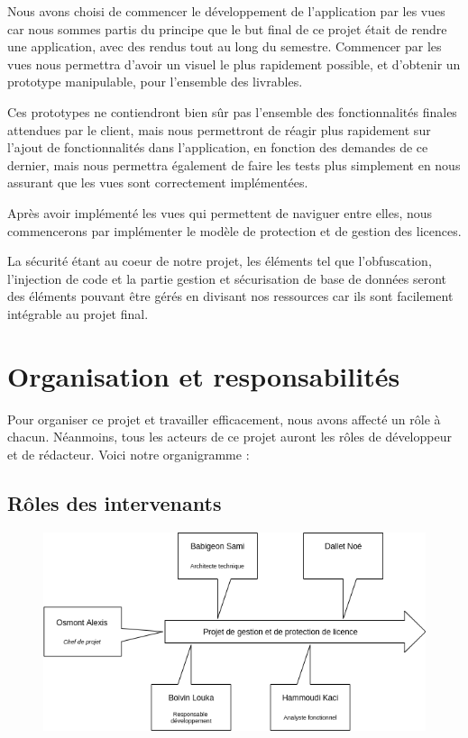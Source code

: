 Nous avons choisi de commencer le développement de l’application par les vues car
nous sommes partis du principe que le but final de ce projet était de rendre une application,
avec des rendus tout au long du semestre. Commencer par les vues nous permettra d’avoir
un visuel le plus rapidement possible, et d’obtenir un prototype manipulable, pour l’ensemble
des livrables.\newline

Ces prototypes ne contiendront bien sûr pas l’ensemble des fonctionnalités finales
attendues par le client, mais nous permettront de réagir plus rapidement sur l’ajout de
fonctionnalités dans l’application, en fonction des demandes de ce dernier, mais nous
permettra également de faire les tests plus simplement en nous assurant que
les vues sont correctement implémentées.\newline

Après avoir implémenté les vues qui permettent de naviguer entre elles, nous
commencerons par implémenter le modèle de protection et de gestion des licences.\newline

La sécurité étant au coeur de notre projet, les éléments tel que l'obfuscation, l'injection de code
et la partie gestion et sécurisation de base de données seront des éléments pouvant être gérés en
divisant nos ressources car ils sont facilement intégrable au projet final.

\chapter{Organisation et responsabilités}

Pour organiser ce projet et travailler efficacement, nous avons affecté un rôle à
chacun. Néanmoins, tous les acteurs de ce projet auront les rôles de développeur et de
rédacteur. Voici notre organigramme :\newline

\section{Rôles des intervenants}

\begin{figure}[!h]
    \centering
    \includegraphics[width=15cm]{schema_role_projet.png}
\end{figure}

